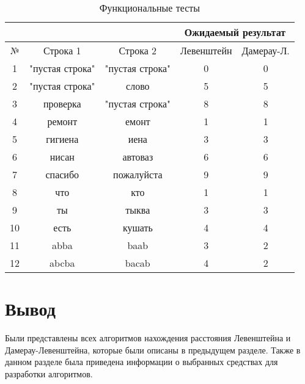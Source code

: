 \begin{table}[h]
	\begin{center}
        \begin{threeparttable}
        \captionsetup{justification=raggedleft,singlelinecheck=off}
		\caption{\label{tbl:functional_test} Функциональные тесты}
		\begin{tabular}{|c|c|c|c|c|}
			\hline
			& & & \multicolumn{2}{c|}{Ожидаемый результат} \\
			\hline
			№&Строка 1&Строка 2&Левенштейн&Дамерау-Л. \\
			\hline
            1&"пустая строка"&"пустая строка"&0&0 \\
            \hline
            2&"пустая строка"&слово&5&5 \\
            \hline
            3&проверка&"пустая строка"&8&8 \\
            \hline
            4&ремонт&емонт&1&1 \\
			\hline
			5&гигиена&иена&3&3 \\
			\hline
            6&нисан&автоваз&6&6 \\
			\hline
			7&спасибо&пожалуйста&9&9 \\
			\hline
            8&что&кто&1&1 \\
			\hline
            9&ты&тыква&3&3 \\
			\hline
            10&есть&кушать&4&4 \\
			\hline
			11&abba&baab&3&2 \\
			\hline
            12&abcba&bacab&4&2 \\
			\hline
		\end{tabular}
        \end{threeparttable}
	\end{center}
\end{table}

\section{Вывод}

Были представлены всех алгоритмов нахождения расстояния Левенштейна и Дамерау-Левенштейна, которые были описаны в предыдущем разделе. Также в данном разделе была приведена информации о выбранных средствах для разработки алгоритмов.
